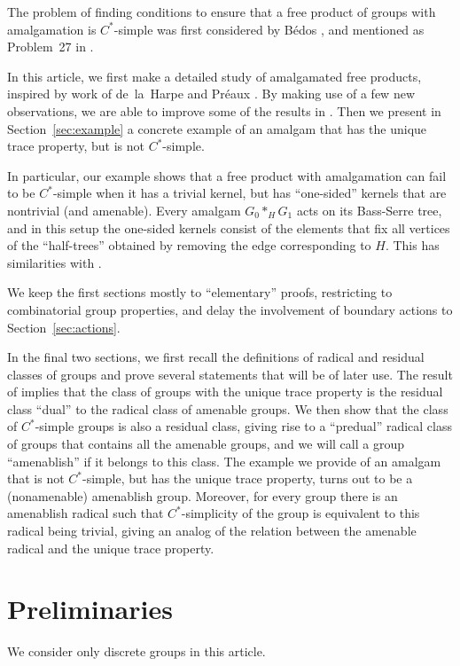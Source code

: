 \documentclass[a4paper]{amsart}
\theoremstyle{plain}
\theoremstyle{definition}
\theoremstyle{remark}
\numberwithin{theorem}{section}
\begin{document}
The problem of finding conditions to ensure that a free product of groups with amalgamation is $C^*$-simple
was first considered by B{\'e}dos \cite{Bedos},
and mentioned as Problem~27 in \cite{Harpe2}.

In this article, we first make a detailed study of amalgamated free products,
inspired by work of de~la~Harpe and Pr{\'e}aux \cite{HP}.
By making use of a few new observations, we are able to improve some of the results in \cite{HP}.
Then we present in Section~\ref{sec:example} a concrete example of an amalgam that has the unique trace property, but is not $C^*$-simple.

In particular, our example shows that a free product with amalgamation can fail to be $C^*$-simple when it has a trivial kernel,
but has ``one-sided'' kernels that are nontrivial (and amenable).
Every amalgam $G_0*_HG_1$ acts on its Bass-Serre tree, and in this setup the one-sided kernels
consist of the elements that fix all vertices of the ``half-trees'' obtained by removing the edge corresponding to $H$.
This has similarities with \cite{Boudec}.

We keep the first sections mostly to ``elementary'' proofs,
restricting to combinatorial group properties,
and delay the involvement of boundary actions to Section~\ref{sec:actions}.

In the final two sections, we first recall the definitions of radical and residual classes of groups
and prove several statements that will be of later use.
The result of \cite{BKKO} implies that
the class of groups with the unique trace property is the residual class ``dual'' to the radical class of amenable groups.
We then show that the class of $C^*$-simple groups is also a residual class,
giving rise to a ``predual'' radical class of groups that contains all the amenable groups,
and we will call a group ``amenablish'' if it belongs to this class.
The example we provide of an amalgam that is not $C^*$-simple, but has the unique trace property,
turns out to be a (nonamenable) amenablish group.
Moreover,
for every group there is an amenablish radical such that $C^*$-simplicity of the group is equivalent to this radical being trivial,
giving an analog of the relation between the amenable radical and the unique trace property.


\section{Preliminaries}

We consider only discrete groups in this article.
\end{document}
